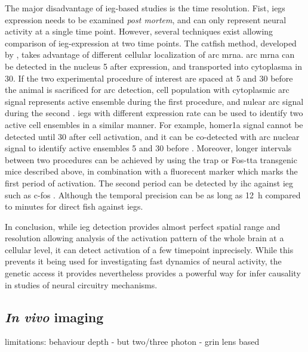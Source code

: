 The major disadvantage of \gls{ieg}-based studies is the time resolution. Fist, \glspl{ieg} expression needs to be examined \textit{post mortem}, and can only represent neural activity at a single time point. However, several techniques exist allowing comparison of \gls{ieg}-expression at two time points. The \gls{catfish} method, developed by \citet{guzowski99}, takes advantage of different cellular localization of \gls{arc} \gls{mrna}. \Gls{arc} \gls{mrna} can be detected in the nucleus \SI{5}{\min} after expression, and transported into cytoplasma in \SI{30}{\min}. If the two experimental procedure of interest are spaced at \SI{5}{\min} and \SI{30}{\min} before the animal is sacrificed for \gls{arc} detection, cell population with cytoplasmic \gls{arc} signal represents active ensemble during the first procedure, and nulear \gls{arc} signal during the second \citep{guzowski99}. \Glspl{ieg} with different expression rate can be used to identify two active cell ensembles in a similar manner. For example, homer1a signal cannot be detected until \SI{30}{\min} after cell activation, and it can be co-detected with \gls{arc} nuclear signal to identify active ensembles \SI{5}{\min} and \SI{30}{\min} before \citep{vazdarjanova04}. Moreover, longer intervals between two procedures can be achieved by using the \gls{trap} or Fos-\gls{tta} transgenic mice described above, in combination with a fluorecent marker which marks the first period of activation. The second period can be detected by \gls{ihc} against \gls{ieg} such as c-fos \citep{reijmers07, guenthner13}. Although the temporal precision can be as long as \SI{12}{\hour} compared to minutes for direct \gls{fish} against \glspl{ieg}.

In conclusion, while \gls{ieg} detection provides almost perfect spatial range and resolution allowing analysis of the activation pattern of the whole brain at a cellular level, it can detect activation of a few timepoint inprecisely. While this prevents it being used for investigating fast dynamics of neural activity, the genetic access it provides nevertheless provides a powerful way for infer causality in studies of neural circuitry mechanisms.


\subsection{\textit{In vivo} imaging}

limitations:
behaviour
depth
    - but two/three photon
    - grin lens based

